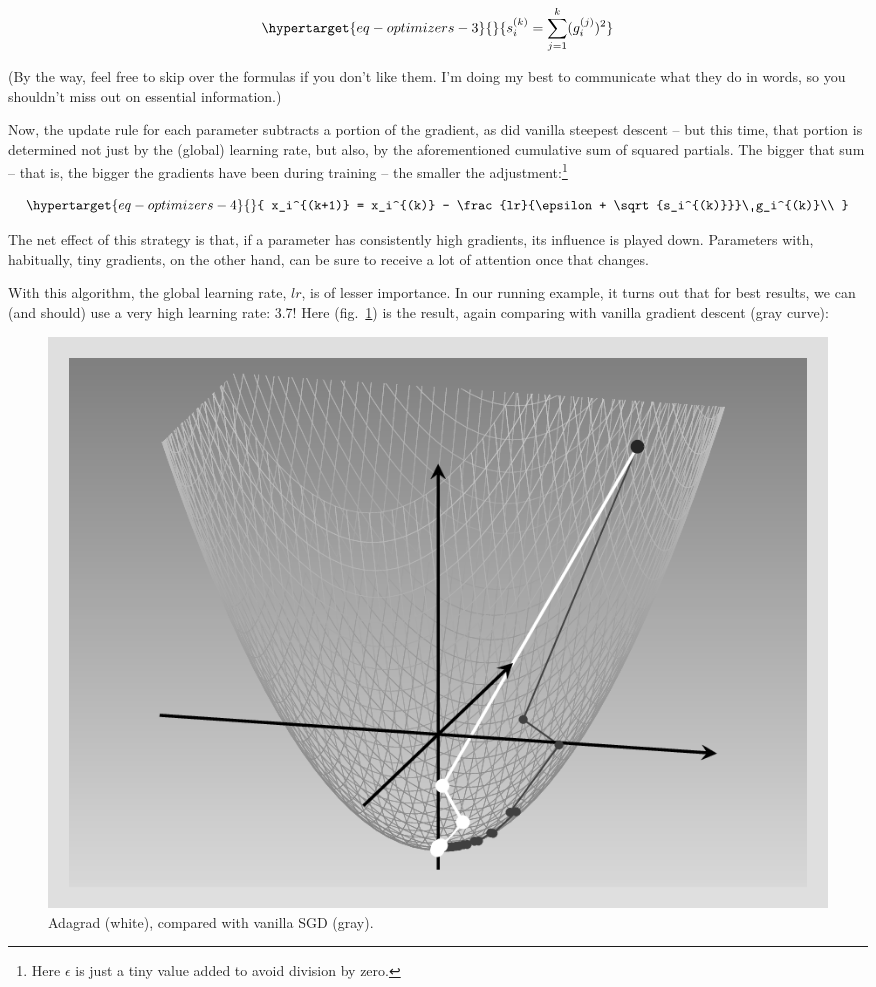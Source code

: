 \documentclass[
  letterpaper,
]{krantz}
\begin{document}
\begin{equation}\protect\hypertarget{eq-optimizers-3}{}{
s_i^{(k)} = \sum_{j=1}^k (g_i^{(j)})^2
}\label{eq-optimizers-3}\end{equation}

(By the way, feel free to skip over the formulas if you don't like them.
I'm doing my best to communicate what they do in words, so you shouldn't
miss out on essential information.)

Now, the update rule for each parameter subtracts a portion of the
gradient, as did vanilla steepest descent -- but this time, that portion
is determined not just by the (global) learning rate, but also, by the
aforementioned cumulative sum of squared partials. The bigger that sum
-- that is, the bigger the gradients have been during training -- the
smaller the adjustment:\footnote{Here \(\epsilon\) is just a tiny value
  added to avoid division by zero.}

\begin{equation}\protect\hypertarget{eq-optimizers-4}{}{
x_i^{(k+1)} = x_i^{(k)} - \frac{lr}{\epsilon + \sqrt{s_i^{(k)}}}\ g_i^{(k)}\\
}\label{eq-optimizers-4}\end{equation}

The net effect of this strategy is that, if a parameter has consistently
high gradients, its influence is played down. Parameters with,
habitually, tiny gradients, on the other hand, can be sure to receive a
lot of attention once that changes.

With this algorithm, the global learning rate, \(lr\), is of lesser
importance. In our running example, it turns out that for best results,
we can (and should) use a very high learning rate: 3.7! Here
(fig.~\ref{fig-optimizers-adagrad}) is the result, again comparing with
vanilla gradient descent (gray curve):

\begin{figure}[H]

{\centering \includegraphics{images/optimizers-adagrad.png}

}

\caption{\label{fig-optimizers-adagrad}Adagrad (white), compared with
vanilla SGD (gray).}

\end{figure}
\end{document}
